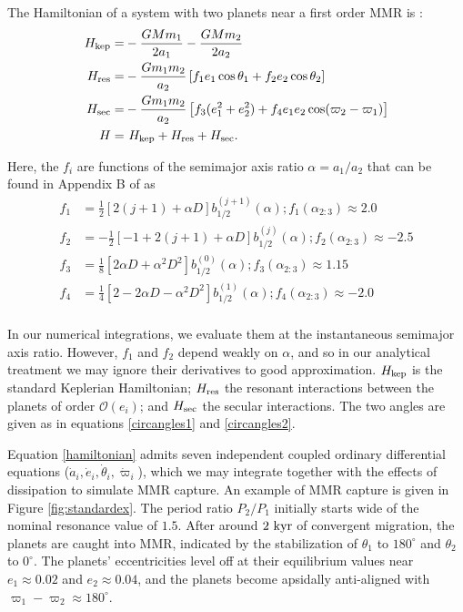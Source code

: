 \documentclass[usenatbib]{mnras}
\renewcommand{\O}{\mathcal{O}}
\begin{document}
The Hamiltonian of a system with two planets near a first order MMR is
\cite{murray_solar_2000}:
\begin{align}
\label{hamiltonian}
  H_{\rm kep} = & -\frac{G M m_{1}}{2 a_{1}}-\frac{G M m_{2}}{2 a_{2}}\\
  H_{\rm res} = & -\frac{G m_{1} m_{2}}{a_{2}}
                  \left[
                  f_{1} e_{1} \cos \theta_{1} 
                  +f_{2} e_{2} \cos \theta_{2}\right]\\
  H_{\rm sec} = &-\frac{G m_{1} m_{2}}{a_{2}}\left[f_{3} (e_1^2 + e_2^2)
                  +f_4e_1e_2\cos(\varpi_2-\varpi_1)
                  \right] \\
  H = &~ H_{\rm kep} + H_{\rm res}+ H_{\rm sec}. 
\end{align}

\noindent Here, the \(f_i\) are functions of the semimajor
axis ratio \(\alpha=a_1/a_2\) that can be found in Appendix B of
\citet{murray_solar_2000} as
\begin{align}
\label{coefficients}
  f_1 &= \frac12[2(j+1)+\alpha D]b_{1/2}^{(j+1)}(\alpha); f_1(\alpha_{2:3})\approx 2.0 \\
  f_2 &= -\frac12[-1+2(j+1)+\alpha D]b_{1/2}^{(j)}(\alpha);f_2(\alpha_{2:3}) \approx -2.5\\
  f_3 &= \frac18[2\alpha D + \alpha^2 D^2]b_{1/2}^{(0)}(\alpha); f_3(\alpha_{2:3})\approx 1.15\\
  f_4 &= \frac14[2-2\alpha D - \alpha^2 D^2]b_{1/2}^{(1)}(\alpha); f_4(\alpha_{2:3})\approx -2.0 \\
\end{align}

\noindent In our numerical integrations, we evaluate them at
the instantaneous semimajor axis ratio.  However, \(f_1\) and \(f_2\)
depend weakly on \(\alpha\), and so in our analytical treatment we may
ignore their derivatives to good approximation.  \(H_{\rm kep}\) is the
standard Keplerian Hamiltonian; \(H_{\rm res}\) the resonant
interactions between the planets of order \(\O(e_i)\); and \(H_{\rm sec}\)
the secular interactions.  The two angles are given as in equations
\eqref{circangles1} and \eqref{circangles2}.

Equation \eqref{hamiltonian} admits seven independent coupled ordinary
differential equations (\(\dot a_i, \dot e_i, \dot\theta_i,
\dot\varpi_i\)), which we may integrate together with the effects of
dissipation to simulate MMR capture.  An example of MMR capture is
given in Figure \ref{fig:standardex}.  The period ratio \(P_2/P_1\)
initially starts wide of the nominal resonance value of \(1.5\).  After
around \(2~\rm{kyr}\) of convergent migration, the planets are caught
into MMR, indicated by the stabilization of \(\theta_1\) to \(180^\circ\)
and \(\theta_2\) to \(0^\circ\).  The planets' eccentricities level off at
their equilibrium values near \(e_1\approx 0.02\) and \(e_2\approx0.04\),
and the planets become apsidally anti-aligned with
\(\varpi_1-\varpi_2\approx 180^\circ\).
\end{document}

